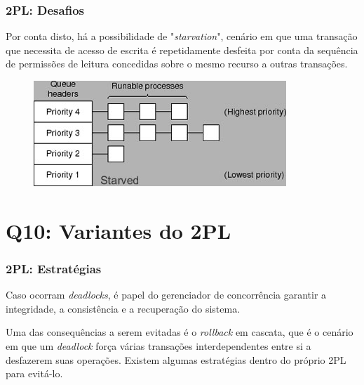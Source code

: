 \documentclass{beamer}
\begin{document}
\begin{frame} %
    \frametitle{2PL: Desafios}
    Por conta disto, há a possibilidade de "\emph{starvation}", cenário em que uma transação que necessita de acesso de escrita é repetidamente desfeita por conta da sequência de permissões de leitura concedidas sobre o mesmo recurso a outras transações.

    \medskip
    \begin{figure}
        \includegraphics[width=0.8\linewidth]{starvation.jpg}
    \end{figure}
\end{frame}

\section{Q10: Variantes do 2PL}


\begin{frame} %
    \frametitle{2PL: Estratégias}
    
    Caso ocorram \emph{deadlocks}, é papel do gerenciador de concorrência garantir a integridade, a consistência e a recuperação do sistema.
    
    \medskip
    Uma das consequências a serem evitadas é o \emph{rollback} em cascata, que é o cenário em que um \emph{deadlock} força várias transações interdependentes entre si a desfazerem suas operações. Existem algumas estratégias dentro do próprio 2PL para evitá-lo.
\end{frame}
\end{document}
